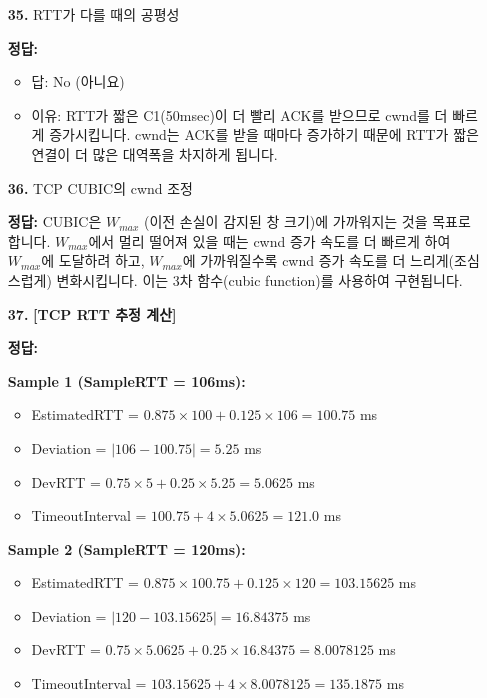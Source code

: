 \documentclass[a4paper, 10pt]{article}
\newcommand{\sectionbox}[1]{
  \vspace{0.5em}
  \noindent\fbox{\textbf{#1}}
  \vspace{0.5em}
}
\begin{document}
\begin{enumerate}[itemsep=2.5em, leftmargin=2em, label={}]
\item[\textbf{35.}] RTT가 다를 때의 공평성
\vspace{0.5em}

\noindent\textbf{정답:}
\begin{itemize}[itemsep=0.3em]
    \item 답: No (아니요)
    \item 이유: RTT가 짧은 C1(50msec)이 더 빨리 ACK를 받으므로 cwnd를 더 빠르게 증가시킵니다. cwnd는 ACK를 받을 때마다 증가하기 때문에 RTT가 짧은 연결이 더 많은 대역폭을 차지하게 됩니다.
\end{itemize}

\item[\textbf{36.}] TCP CUBIC의 cwnd 조정
\vspace{0.5em}

\noindent\textbf{정답:} CUBIC은 $W_{max}$ (이전 손실이 감지된 창 크기)에 가까워지는 것을 목표로 합니다. $W_{max}$에서 멀리 떨어져 있을 때는 cwnd 증가 속도를 더 빠르게 하여 $W_{max}$에 도달하려 하고, $W_{max}$에 가까워질수록 cwnd 증가 속도를 더 느리게(조심스럽게) 변화시킵니다. 이는 3차 함수(cubic function)를 사용하여 구현됩니다.


\item[] \sectionbox{VI. 계산 및 분석 문제 (2문제)}

\item[\textbf{37.}] \textbf{[TCP RTT 추정 계산]}
\vspace{0.5em}

\noindent\textbf{정답:}

\textbf{Sample 1 (SampleRTT = 106ms):}
\begin{itemize}[itemsep=0.2em]
    \item EstimatedRTT = $0.875 \times 100 + 0.125 \times 106 = 100.75$ ms
    \item Deviation = $|106 - 100.75| = 5.25$ ms
    \item DevRTT = $0.75 \times 5 + 0.25 \times 5.25 = 5.0625$ ms
    \item TimeoutInterval = $100.75 + 4 \times 5.0625 = 121.0$ ms
\end{itemize}

\textbf{Sample 2 (SampleRTT = 120ms):}
\begin{itemize}[itemsep=0.2em]
    \item EstimatedRTT = $0.875 \times 100.75 + 0.125 \times 120 = 103.15625$ ms
    \item Deviation = $|120 - 103.15625| = 16.84375$ ms
    \item DevRTT = $0.75 \times 5.0625 + 0.25 \times 16.84375 = 8.0078125$ ms
    \item TimeoutInterval = $103.15625 + 4 \times 8.0078125 = 135.1875$ ms
\end{itemize}


\end{enumerate}
\end{document}
